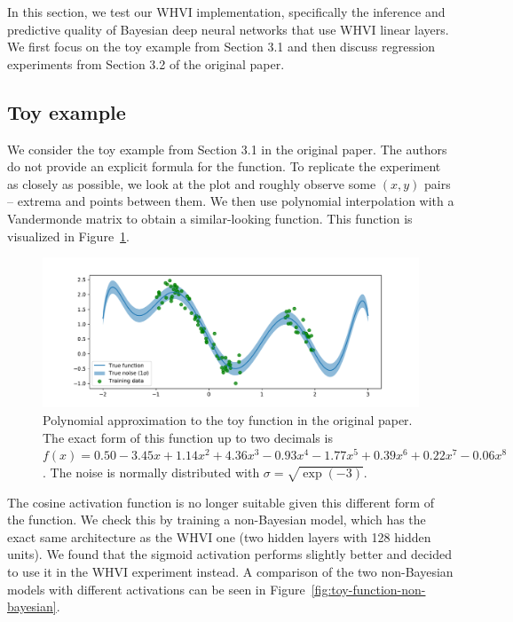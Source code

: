 In this section, we test our WHVI implementation, specifically the inference and predictive quality of Bayesian deep neural networks that use WHVI linear layers.
We first focus on the toy example from Section 3.1 and then discuss regression experiments from Section 3.2 of the original paper.

\subsection{Toy example}\label{subsec:toy-example}
We consider the toy example from Section 3.1 in the original paper.
The authors do not provide an explicit formula for the function.
To replicate the experiment as closely as possible, we look at the plot and roughly observe some $(x, y)$ pairs -- extrema and points between them.
We then use polynomial interpolation with a Vandermonde matrix to obtain a similar-looking function.
This function is visualized in Figure~\ref{fig:toy-function}.

\begin{figure}[htb]
    \centering
    \includegraphics[width=1.0\hsize]{img/toy-function}
    \caption{Polynomial approximation to the toy function in the original paper.
    The exact form of this function up to two decimals is $f(x) = 0.50 -3.45x + 1.14x^2 + 4.36x^3 -0.93x^4 -1.77x^5 + 0.39x^6 + 0.22x^7 -0.06x^8$.
    The noise is normally distributed with $\sigma = \sqrt{\exp (-3)}$.
    }
    \label{fig:toy-function}
\end{figure}

The cosine activation function is no longer suitable given this different form of the function.
We check this by training a non-Bayesian model, which has the exact same architecture as the WHVI one (two hidden layers with 128 hidden units).
We found that the sigmoid activation performs slightly better and decided to use it in the WHVI experiment instead.
A comparison of the two non-Bayesian models with different activations can be seen in Figure~\ref{fig:toy-function-non-bayesian}.

